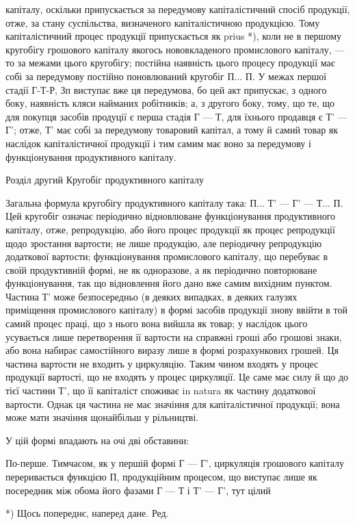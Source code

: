 капіталу, оскільки припускається за передумову капіталістичний спосіб
продукції, отже, за стану суспільства, визначеного капіталістичною продукцією.
Тому капіталістичний процес продукції припускається як prius *),
коли не в першому кругобігу грошового капіталу якогось нововкладеного
промислового капіталу, — то за межами цього кругобігу; постійна наявність
цього процесу продукції має собі за передумову постійно поновлюваний кругобіг П... П. У межах першої
стадії Г-Т-Р, Зп виступає вже ця передумова, бо цей акт припускає, з одного боку, наявність кляси
найманих робітників; а, з другого боку, тому, що те, що для покупця
засобів продуції є перша стадія Г — Т, для їхнього продавця є Т' — Г';
отже, Т' має собі за передумову товаровий капітал, а тому й самий
товар як наслідок капіталістичної продукції і тим самим має воно за
передумову і функціонування продуктивного капіталу.

Розділ другий
Кругобіг продуктивного капіталу

Загальна формула кругобігу продуктивного капіталу така: П... Т' —
Г' — Т... П. Цей кругобіг означає періодично відновлюване функціонування
продуктивного капіталу, отже, репродукцію, або його процес
продукції як процес репродукції щодо зростання вартости; не лише
продукцію, але періодичну репродукцію додаткової вартости; функціонування
промислового капіталу, що перебуває в своїй продуктивній формі,
не як одноразове, а як періодично повторюване функціонування, так що
відновлення його дано вже самим вихідним пунктом. Частина Т' може
безпосередньо (в деяких випадках, в деяких галузях приміщення промислового
капіталу) в формі засобів продукції знову ввійти в той самий
процес праці, що з нього вона вийшла як товар; у наслідок цього усувається
лише перетворення її вартости на справжні гроші або грошові
знаки, або вона набирає самостійного виразу лише в формі розрахункових
грошей. Ця частина вартости не входить у циркуляцію. Таким чином
входять у процес продукції вартості, що не входять у процес циркуляції.
Це саме має силу й що до тієї частини Т', що її капіталіст споживає
in natura як частину додаткової вартости. Однак ця частина не має значіння
для капіталістичної продукції; вона може мати значіння щонайбільш
у рільництві.

У цій формі впадають на очі дві обставини:

По-перше. Тимчасом, як у першій формі Г — Г', циркуляція грошового
капіталу переривається функцією П, продукційним процесом, що виступає
лише як посередник між обома його фазами Г — Т і Т' — Г', тут цілий

*) Щось попереднє, наперед дане. Ред.

